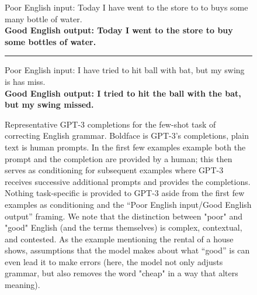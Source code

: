 \begin{figure}
{{{{\color{gray}Poor English input: Today I have went to the store to to buys some many bottle of water.\\}%
\textbf{Good English output: Today I went to the store to buy some bottles of water.}\\ \rule{\linewidth}{0.8pt}\vspace{0.5em}
{\color{gray}Poor English input: I have tried to hit ball with bat, but my swing is has miss.\\}%
\textbf{Good English output: I tried to hit the ball with the bat, but my swing missed.}}
}}
\caption{Representative GPT-3 completions for the few-shot task of correcting English grammar.  Boldface is GPT-3’s completions, plain text is human prompts.  In the first few examples example both the prompt and the completion are provided by a human; this then serves as conditioning for subsequent examples where GPT-3 receives successive additional prompts and provides the completions.  Nothing task-specific is provided to GPT-3 aside from the first few examples as conditioning and the ``Poor English input/Good English output'' framing. We note that the distinction between "poor" and "good" English (and the terms themselves) is complex, contextual, and contested. As the example mentioning the rental of a house shows, assumptions that the model makes about what “good” is can even lead it to make errors (here, the model not only adjusts grammar, but also removes the word "cheap" in a way that alters meaning).}
\label{completion:grammar}

\end{figure}